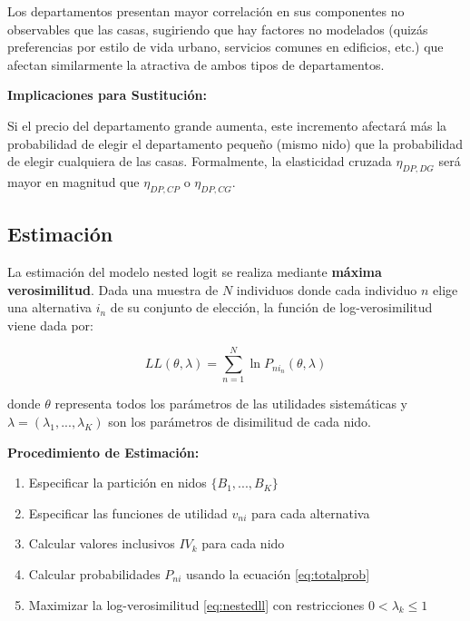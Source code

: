 \documentclass[
]{book}
\providecommand{\tightlist}{%
  \setlength{\itemsep}{0pt}\setlength{\parskip}{0pt}}
\begin{document}
Los departamentos presentan mayor correlación en sus componentes no observables que las casas, sugiriendo que hay factores no modelados (quizás preferencias por estilo de vida urbano, servicios comunes en edificios, etc.) que afectan similarmente la atractiva de ambos tipos de departamentos.

\textbf{Implicaciones para Sustitución:}

Si el precio del departamento grande aumenta, este incremento afectará más la probabilidad de elegir el departamento pequeño (mismo nido) que la probabilidad de elegir cualquiera de las casas. Formalmente, la elasticidad cruzada \(\eta_{DP,DG}\) será mayor en magnitud que \(\eta_{DP,CP}\) o \(\eta_{DP,CG}\).

\subsection{Estimación}\label{estimaciuxf3n-2}

La estimación del modelo nested logit se realiza mediante \textbf{máxima verosimilitud}. Dada una muestra de \(N\) individuos donde cada individuo \(n\) elige una alternativa \(i_n\) de su conjunto de elección, la función de log-verosimilitud viene dada por:

\begin{equation}
LL(\theta, \lambda) = \sum_{n=1}^N \ln P_{ni_n}(\theta, \lambda)
\label{eq:nestedll}
\end{equation}

donde \(\theta\) representa todos los parámetros de las utilidades sistemáticas y \(\lambda = (\lambda_1, ..., \lambda_K)\) son los parámetros de disimilitud de cada nido.

\textbf{Procedimiento de Estimación:}

\begin{enumerate}
\def\labelenumi{\arabic{enumi}.}
\tightlist
\item
  Especificar la partición en nidos \(\{B_1, ..., B_K\}\)
\item
  Especificar las funciones de utilidad \(v_{ni}\) para cada alternativa
\item
  Calcular valores inclusivos \(IV_k\) para cada nido
\item
  Calcular probabilidades \(P_{ni}\) usando la ecuación \eqref{eq:totalprob}
\item
  Maximizar la log-verosimilitud \eqref{eq:nestedll} con restricciones \(0 < \lambda_k \leq 1\)
\end{enumerate}
\end{document}
